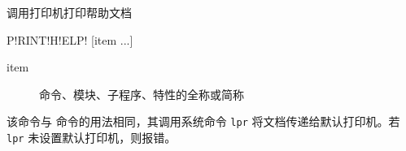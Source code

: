 \label{cmd:printhelp}

调用打印机打印帮助文档

\begin{SACSTX}
P!RINT!H!ELP! [item ...]
\end{SACSTX}

\begin{description}
\item [item] 命令、模块、子程序、特性的全称或简称
\end{description}

该命令与  命令的用法相同，其调用系统命令 \texttt{lpr}
将文档传递给默认打印机。若 \texttt{lpr} 未设置默认打印机，则报错。
